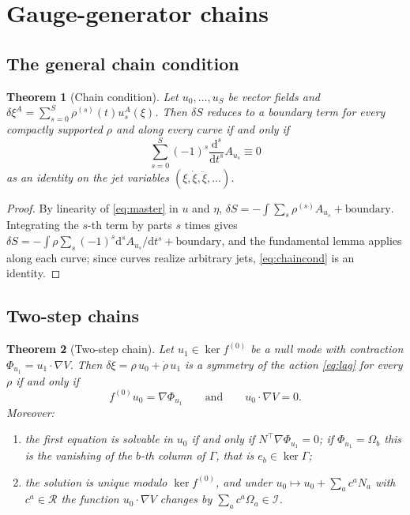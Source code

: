 \documentclass[12pt]{article}
\theoremstyle{plain}
\newtheorem{theorem}{Theorem}[section]
\theoremstyle{definition}
\theoremstyle{remark}
\newcommand{\dd}{\mathrm{d}}
\newcommand{\Om}{\Omega}
\newcommand{\Ical}{\mathcal{I}}
\newcommand{\Rring}{\mathcal{R}}
\begin{document}
	\section{Gauge-generator chains}
	\label{sec:chains}
	
	\subsection{The general chain condition}
	
	\begin{theorem}[Chain condition]
		\label{thm:chain}
		Let $u_{0},\dots,u_{S}$ be vector fields and
		$\delta\xi^{A}=\sum_{s=0}^{S}\rho^{(s)}(t)u_{s}^{A}(\xi)$. Then $\delta S$
		reduces to a boundary term for every compactly supported $\rho$ and along every
		curve if and only if
		\begin{equation}
			\sum_{s=0}^{S}(-1)^{s}\frac{\dd^{s}}{\dd t^{s}}A_{u_{s}}\equiv0
			\label{eq:chaincond}
		\end{equation}
		as an identity on the jet variables $(\xi,\dot\xi,\ddot\xi,\dots)$.
	\end{theorem}
	
	\begin{proof}
		By linearity of \eqref{eq:master} in $u$ and $\eta$,
		$\delta S=-\int\sum_{s}\rho^{(s)}A_{u_{s}}+\text{boundary}$. Integrating the
		$s$-th term by parts $s$ times gives
		$\delta S=-\int\rho\sum_{s}(-1)^{s}\dd^{s}A_{u_{s}}/\dd t^{s}+\text{boundary}$,
		and the fundamental lemma applies along each curve; since curves realize
		arbitrary jets, \eqref{eq:chaincond} is an identity.
	\end{proof}
	
	\subsection{Two-step chains}
	
	\begin{theorem}[Two-step chain]
		\label{thm:chain2}
		Let $u_{1}\in\ker f^{(0)}$ be a null mode with contraction
		$\Phi_{u_{1}}=u_{1}\cdot\nabla V$. Then
		$\delta\xi=\rho\,u_{0}+\dot\rho\,u_{1}$ is a symmetry of the action
		\eqref{eq:lag} for every $\rho$ if and only if
		\begin{equation}
			f^{(0)}u_{0}=\nabla\Phi_{u_{1}}
			\qquad\text{and}\qquad
			u_{0}\cdot\nabla V=0 .
			\label{eq:chain2}
		\end{equation}
		Moreover:
		\begin{enumerate}[label=(\alph*),leftmargin=2.2em,itemsep=0.25em]
			\item the first equation is solvable in $u_{0}$ if and only if
			$N^{\top}\nabla\Phi_{u_{1}}=0$; if $\Phi_{u_{1}}=\Om_{b}$ this is the
			vanishing of the $b$-th column of $\Gamma$, that is $e_{b}\in\ker\Gamma$;
			\item the solution is unique modulo $\ker f^{(0)}$, and under
			$u_{0}\mapsto u_{0}+\sum_{a}c^{a}N_{a}$ with $c^{a}\in\Rring$ the function
			$u_{0}\cdot\nabla V$ changes by $\sum_{a}c^{a}\Om_{a}\in\Ical$.
		\end{enumerate}
	\end{theorem}
	
\end{document}
